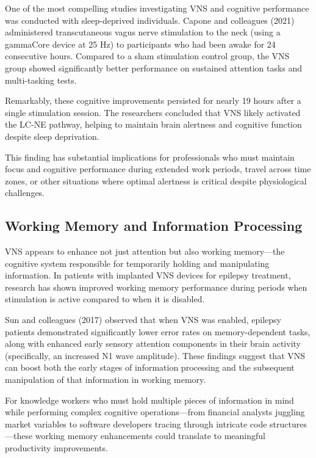 \documentclass[
  Letterpaper,
]{scrbook}
\begin{document}
One of the most compelling studies investigating VNS and cognitive
performance was conducted with sleep-deprived individuals. Capone and
colleagues (2021) administered transcutaneous vagus nerve stimulation to
the neck (using a gammaCore device at 25 Hz) to participants who had
been awake for 24 consecutive hours. Compared to a sham stimulation
control group, the VNS group showed significantly better performance on
sustained attention tasks and multi-tasking tests.

Remarkably, these cognitive improvements persisted for nearly 19 hours
after a single stimulation session. The researchers concluded that VNS
likely activated the LC-NE pathway, helping to maintain brain alertness
and cognitive function despite sleep deprivation.

This finding has substantial implications for professionals who must
maintain focus and cognitive performance during extended work periods,
travel across time zones, or other situations where optimal alertness is
critical despite physiological challenges.

\subsection{Working Memory and Information
Processing}\label{working-memory-and-information-processing}

VNS appears to enhance not just attention but also working memory---the
cognitive system responsible for temporarily holding and manipulating
information. In patients with implanted VNS devices for epilepsy
treatment, research has shown improved working memory performance during
periods when stimulation is active compared to when it is disabled.

Sun and colleagues (2017) observed that when VNS was enabled, epilepsy
patients demonstrated significantly lower error rates on
memory-dependent tasks, along with enhanced early sensory attention
components in their brain activity (specifically, an increased N1 wave
amplitude). These findings suggest that VNS can boost both the early
stages of information processing and the subsequent manipulation of that
information in working memory.

For knowledge workers who must hold multiple pieces of information in
mind while performing complex cognitive operations---from financial
analysts juggling market variables to software developers tracing
through intricate code structures---these working memory enhancements
could translate to meaningful productivity improvements.
\end{document}
